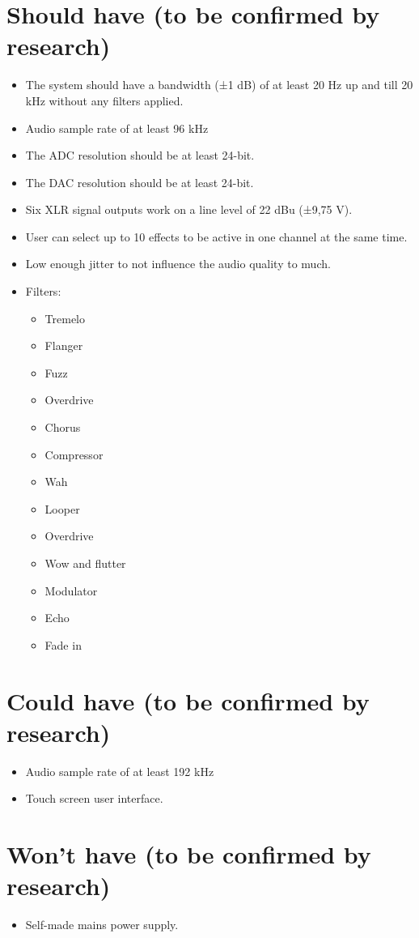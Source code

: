 	\section{Should have (to be confirmed by research)}
		\begin{itemize}
		\setlength\itemsep{-0.2em}
			\item The system should have a bandwidth (±1 dB) of at least 20 Hz up and till 20 kHz without any filters applied.
			\item Audio sample rate of at least 96 kHz
			\item The ADC resolution should be at least 24-bit.
			\item The DAC resolution should be at least 24-bit.
			\item Six XLR signal outputs work on a line level of 22 dBu (±9,75 V).
			\item User can select up to 10 effects to be active in one channel at the same time.
			\item Low enough jitter to not influence the audio quality to much.
			\item Filters:
			\begin{itemize}
			\setlength\itemsep{-0.2em}
				\item Tremelo
				\item Flanger
				\item Fuzz
				\item Overdrive
				\item Chorus
				\item Compressor
				\item Wah
				\item Looper
				\item Overdrive
				\item Wow and flutter
				\item Modulator 
				\item Echo
				\item Fade in
			\end{itemize}
		\end{itemize}
	
	\section{Could have (to be confirmed by research)}
		\begin{itemize}
		\setlength\itemsep{-0.2em}
			\item Audio sample rate of at least 192 kHz
			\item Touch screen user interface.
		\end{itemize}
	
	\section{Won't have (to be confirmed by research)}
		\begin{itemize}
		\setlength\itemsep{-0.2em}
			\item Self-made mains power supply.
		\end{itemize}